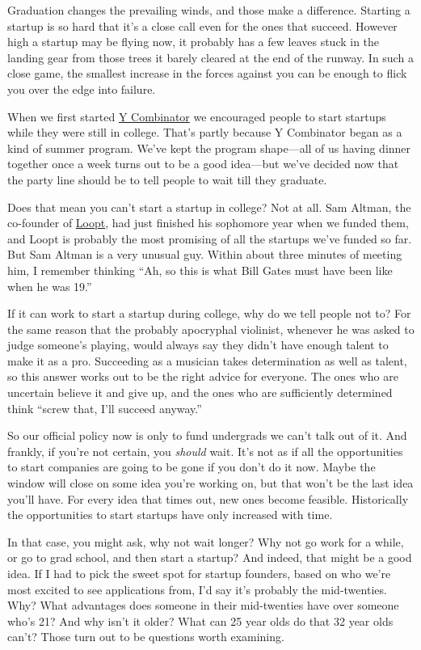 \documentclass[12pt]{book}
\begin{document}
Graduation changes the prevailing winds, and those make a difference.
Starting a startup is so hard that it's a close call even for the ones
that succeed. However high a startup may be flying now, it probably has
a few leaves stuck in the landing gear from those trees it barely
cleared at the end of the runway. In such a close game, the smallest
increase in the forces against you can be enough to flick you over the
edge into failure.

When we first started \href{http://ycombinator.com}{Y Combinator} we
encouraged people to start startups while they were still in college.
That's partly because Y Combinator began as a kind of summer program.
We've kept the program shape---all of us having dinner together once a
week turns out to be a good idea---but we've decided now that the party
line should be to tell people to wait till they graduate.

Does that mean you can't start a startup in college? Not at all. Sam
Altman, the co-founder of \href{http://loopt.com}{Loopt}, had just
finished his sophomore year when we funded them, and Loopt is probably
the most promising of all the startups we've funded so far. But Sam
Altman is a very unusual guy. Within about three minutes of meeting him,
I remember thinking ``Ah, so this is what Bill Gates must have been like
when he was 19.''

If it can work to start a startup during college, why do we tell people
not to? For the same reason that the probably apocryphal violinist,
whenever he was asked to judge someone's playing, would always say they
didn't have enough talent to make it as a pro. Succeeding as a musician
takes determination as well as talent, so this answer works out to be
the right advice for everyone. The ones who are uncertain believe it and
give up, and the ones who are sufficiently determined think ``screw
that, I'll succeed anyway.''

So our official policy now is only to fund undergrads we can't talk out
of it. And frankly, if you're not certain, you \emph{should} wait. It's
not as if all the opportunities to start companies are going to be gone
if you don't do it now. Maybe the window will close on some idea you're
working on, but that won't be the last idea you'll have. For every idea
that times out, new ones become feasible. Historically the opportunities
to start startups have only increased with time.

In that case, you might ask, why not wait longer? Why not go work for a
while, or go to grad school, and then start a startup? And indeed, that
might be a good idea. If I had to pick the sweet spot for startup
founders, based on who we're most excited to see applications from, I'd
say it's probably the mid-twenties. Why? What advantages does someone in
their mid-twenties have over someone who's 21? And why isn't it older?
What can 25 year olds do that 32 year olds can't? Those turn out to be
questions worth examining.
\end{document}
